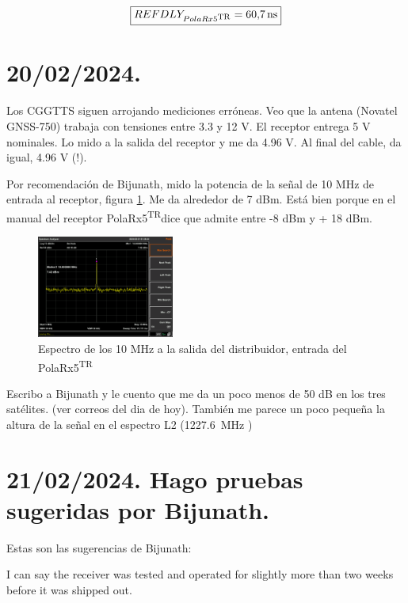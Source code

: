 \documentclass[11pt]{article}
\newcommand{\polar}[0]{PolaRx5\textsuperscript{TR}}
\begin{document}
\begin{equation}
\boxed{REFDLY_{\polar}=\SI{60.7}{\nano\second}}\label{eq:REFDLY} 
\end{equation}



\section{20/02/2024.}
Los CGGTTS siguen arrojando mediciones erróneas. Veo que la antena (Novatel GNSS-750) trabaja con tensiones entre 3.3 y 12 V. El receptor entrega 5 V nominales. Lo mido a la salida del receptor y me da 4.96 V. Al final del cable, da igual, 4.96 V (!).


Por recomendación de Bijunath, mido la potencia de la señal de 10 MHz de entrada al receptor, figura \ref{fig:espectro10MHz}. Me da alrededor de 7 dBm. Está bien porque en el manual del receptor \polar dice que admite entre  -8 dBm y + 18 dBm.

\begin{figure}[ht]
    \begin{center}
        \includegraphics[width=0.4\textwidth]{./figuras/espectro10MHz}
        \caption{Espectro de los 10 MHz a la salida del distribuidor, entrada del \polar}
        \label{fig:espectro10MHz}
    \end{center}
\end{figure}

Escribo a Bijunath y le cuento que me da un poco menos de 50 dB en los tres satélites. (ver correos del dia de hoy). También me parece un poco pequeña la altura de la señal en el espectro L2 (\SI{1227,6}{\mega\hertz} )


\section{21/02/2024. Hago pruebas sugeridas por Bijunath.}

Estas son las sugerencias de Bijunath:

I can say the receiver was tested and operated for slightly more than two weeks before it was shipped out.
\end{document}
